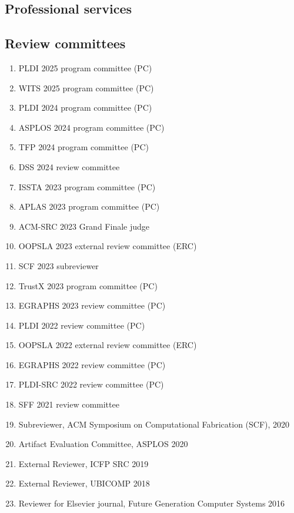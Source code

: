 \documentclass[margin, 10pt]{res} %
\begin{document}
\begin{resume}
\section{Professional services}


\subsection{Review committees}

\begin{enumerate}[itemsep=-2pt]
\item PLDI 2025 program committee (PC)
\item WITS 2025 program committee (PC)
\item PLDI 2024 program committee (PC)
\item ASPLOS 2024 program committee (PC)
\item TFP 2024 program committee (PC)
\item DSS 2024 review committee
\item ISSTA 2023 program committee (PC)
\item APLAS 2023 program committee (PC)
\item ACM-SRC 2023 Grand Finale judge
\item OOPSLA 2023 external review committee (ERC)
\item SCF 2023 subreviewer
\item TrustX 2023 program committee (PC)
\item EGRAPHS 2023 review committee (PC)
\item PLDI 2022 review committee (PC)
\item OOPSLA 2022 external review committee (ERC)
\item EGRAPHS 2022 review committee (PC)
\item PLDI-SRC 2022 review committee (PC)
\item SFF 2021 review committee
\item Subreviewer, ACM Symposium on Computational Fabrication (SCF), 2020
\item Artifact Evaluation Committee, ASPLOS 2020
\item External Reviewer, ICFP SRC 2019
\item External Reviewer, UBICOMP 2018
\item Reviewer for Elsevier journal, Future Generation Computer Systems 2016
\end{enumerate}


\end{resume}
\end{document}
